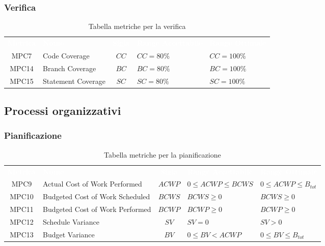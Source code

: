 \subsubsection{Verifica}
    \renewcommand{\arraystretch}{1.5}
    \begin{longtable}{ c C{4cm} c C{3.5cm} C{3.5cm}}
    	\caption{Tabella metriche per la verifica}\\
    	\textcolor{white}{\textbf{Metrica}} & \textcolor{white}{\textbf{Nome}} & \textcolor{white}{\textbf{Sigla}} & \textcolor{white}{\textbf{Range Accettabile}} & \textcolor{white}{\textbf{Range Ottimale}}\\
		MPC7 & Code Coverage & $CC$ & $CC = 80\%$ & $CC = 100\%$  \\
		MPC14 & Branch Coverage & $BC$ & $BC = 80\%$ & $BC = 100\%$  \\
		MPC15 & Statement Coverage & $SC$ & $SC = 80\%$ & $SC = 100\%$  \\
    \end{longtable}
\vspace{0.3cm}
\subsection{Processi organizzativi}

\subsubsection{Pianificazione}
\renewcommand{\arraystretch}{1.5}
\begin{longtable}{ c C{4cm} c C{3.5cm} C{3.5cm}}
	\caption{Tabella metriche per la pianificazione}\\
	\textcolor{white}{\textbf{Metrica}} & \textcolor{white}{\textbf{Nome}} & \textcolor{white}{\textbf{Sigla}} & \textcolor{white}{\textbf{Range Accettabile}} & \textcolor{white}{\textbf{Range Ottimale}}\\
		MPC9 & Actual Cost of Work Performed & $ACWP$ & $0 \leq ACWP \leq BCWS$ & $0 \leq ACWP \leq B_{tot}$ \\
		MPC10 & Budgeted Cost of Work Scheduled & $BCWS$ & $BCWS \geq 0$ &  $BCWS \geq 0$ \\
		MPC11 & Budgeted Cost of Work Performed & $BCWP$ & $BCWP \geq 0$ & $BCWP \geq 0$ \\
		MPC12 & Schedule Variance & $SV$ & $SV = 0$ & $SV > 0$  \\
		MPC13 & Budget Variance & $BV$ & $0 \leq BV < ACWP$ & $0 \leq BV \leq B_{tot}$  \\
	\end{longtable}
